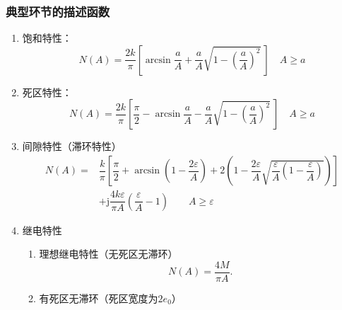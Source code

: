 \documentclass[14pt,a4paper]{article}
\theoremstyle{plain}
\theoremstyle{definition}
\theoremstyle{remark}
\theoremstyle{plain}
\theoremstyle{plain}
\theoremstyle{plain}
\theoremstyle{definition}
\theoremstyle{remark}
\numberwithin{equation}{section}
\begin{document}
			\subsubsection{典型环节的描述函数}%
			\label{ssub:典型环节的描述函数}
			
				\begin{enumerate}
					\item 饱和特性：
						\begin{equation}
						\label{eq:saturate}
						N(A) = \dfrac{2k}{\pi} \left[ \arcsin \dfrac{a}{A} + \dfrac{a}{A}\sqrt{1-\left( \dfrac{a}{A} \right)^2}\   \right] \quad A\ge a
						\end{equation} 
					\item 死区特性：
						\begin{equation}
						\label{eq:deadzone}
						N(A) = \dfrac{2k}{\pi} \left[ \dfrac{\pi}{2} - \arcsin \dfrac{a}{A} - \dfrac{a}{A}\sqrt{1-\left( \dfrac{a}{A} \right)^2}\   \right] \quad A\ge a
						\end{equation} 
                    \item 间隙特性（滞环特性）
                        \begin{equation}
                        \label{eq:backlash} 
                        \begin{split}
                            N(A) =& \dfrac{k}{\pi} \left[ \dfrac{\pi}{2} + \arcsin \left( 1-\dfrac{2\varepsilon}{A} \right) + 2\left( 1-\dfrac{2\varepsilon}{A} \sqrt{\dfrac{\varepsilon}{A}\left( 1-\dfrac{\varepsilon}{A} \right) }  \right) \right] \\ 
                                  &+ \mathrm j \dfrac{4k\varepsilon}{\pi A} \left( \dfrac{\varepsilon}{A} -1 \right) \quad \quad A\ge \varepsilon 
                        \end{split}
                        \end{equation} 
                    \item 继电特性
                        \begin{enumerate}
                            \item 理想继电特性（无死区无滞环）
                                \begin{equation}
                                \label{eq:relay}
                                N(A) = \dfrac{4M}{\pi A}
                                .\end{equation} 
                            \item 有死区无滞环（死区宽度为$2e_0$） 
                                \begin{equation}

\end{equation}
\end{enumerate}
\end{enumerate}
\end{document}
